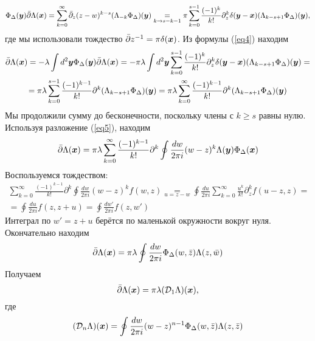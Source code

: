\documentclass[12pt]{article}
\theoremstyle{definition}
\begin{document}
\begin{equation}
    \Phi_\Delta(\bm{y})\Bar{\partial}\Lambda(\bm{x})=\sum\limits_{k=0}^\infty\Bar{\partial}_z(z-w)^{k-s}(\Lambda_{-k}\Phi_\Delta)(\bm{y})\underset{k\rightarrow s-k-1}{=}\pi\sum\limits_{k=0}^{s-1}\frac{(-1)^k}{k!}\partial^k_z\delta(\bm{y}-\bm{x})(\Lambda_{k-s+1}\Phi_\Delta)(\bm{y}),
\end{equation}
где мы использовали тождество $\Bar{\partial}z^{-1}=\pi\delta(\bm{x})$. Из формулы (\ref{eq4}) находим
\begin{multline}
    \Bar{\partial}\Lambda(\bm{x})=-\lambda\int d^2\bm{y}\Phi_\Delta(\bm{y})\Bar{\partial}\Lambda(\bm{x})=-\pi\lambda\int d^2\bm{y}\sum\limits_{k=0}^{s-1}\frac{(-1)^k}{k!}\partial^k_z\delta(\bm{y}-\bm{x})(\Lambda_{k-s+1}\Phi_\Delta)(\bm{y})=\\=\pi\lambda\sum\limits_{k=0}^{s-1}\frac{(-1)^{k-1}}{k!}\partial^k(\Lambda_{k-s+1}\Phi_\Delta)(\bm{y})=\pi\lambda\sum\limits_{k=0}^\infty\frac{(-1)^{k-1}}{k!}\partial^k(\Lambda_{k-s+1}\Phi_\Delta)(\bm{y})
\end{multline}
Мы продолжили сумму до бесконечности, поскольку члены с $k\geq s$ равны нулю. Используя разложение (\ref{eq5}), находим
\begin{equation}
    \Bar{\partial}\Lambda(\bm{x})=\pi\lambda\sum\limits_{k=0}^\infty\frac{(-1)^{k-1}}{k!}\partial^k\oint\frac{dw}{2\pi i}(w-z)^k\Lambda(\bm{y})\Phi_\Delta(\bm{x})
\end{equation}
Воспользуемся тождеством:
\begin{multline}
    \sum\limits_{k=0}^\infty\frac{(-1)^{k-1}}{k!}\partial^k\oint\frac{dw}{2\pi i}(w-z)^kf(w,z)\underset{u=z-w}{=}\oint\frac{du}{2\pi i}\sum\limits_{k=0}^\infty\frac{u^k}{k!}\partial_z^kf(u-z,z)=\\=\oint\frac{du}{2\pi i}f(z,z+u)=\oint\frac{dw'}{2\pi i}f(z,w')
\end{multline}
Интеграл по $w'=z+u$ берётся по маленькой окружности вокруг нуля. Окончательно находим
\begin{equation}
    \Bar{\partial}\Lambda(\bm{x})=\pi\lambda\oint\frac{dw}{2\pi i}\Phi_\Delta(w,\Bar{z})\Lambda(z,\Bar{w})
\end{equation}
Получаем
\begin{equation}
    \Bar{\partial}\Lambda(\bm{x})=\pi\lambda(\mathcal{D}_1\Lambda)(\bm{x}),
\end{equation}
где
\begin{equation}
    (\mathcal{D}_n\Lambda)(\bm{x})=\oint\frac{dw}{2\pi i}(w-z)^{n-1}\Phi_\Delta(w,\Bar{z})\Lambda(z,\Bar{z})
\end{equation}
\end{document}
